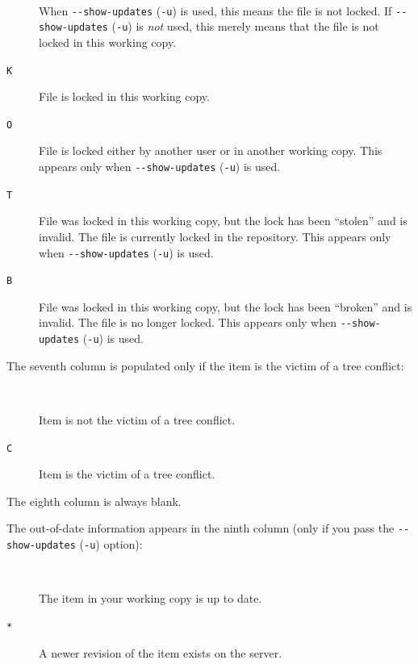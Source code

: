 \begin{description}
\item[\texttt{\textquotesingle{}\ \textquotesingle{}}]
When \texttt{-\/-show-updates} (\texttt{-u}) is used, this means the
file is not locked. If \texttt{-\/-show-updates} (\texttt{-u}) is
\emph{not} used, this merely means that the file is not locked in this
working copy.
\item[\texttt{\textquotesingle{}K\textquotesingle{}}]
File is locked in this working copy.
\item[\texttt{\textquotesingle{}O\textquotesingle{}}]
File is locked either by another user or in another working copy. This
appears only when \texttt{-\/-show-updates} (\texttt{-u}) is used.
\item[\texttt{\textquotesingle{}T\textquotesingle{}}]
File was locked in this working copy, but the lock has been ``stolen''
and is invalid. The file is currently locked in the repository. This
appears only when \texttt{-\/-show-updates} (\texttt{-u}) is used.
\item[\texttt{\textquotesingle{}B\textquotesingle{}}]
File was locked in this working copy, but the lock has been ``broken''
and is invalid. The file is no longer locked. This appears only when
\texttt{-\/-show-updates} (\texttt{-u}) is used.
\end{description}

The seventh column is populated only if the item is the victim of a tree
conflict:

\begin{description}
\item[\texttt{\textquotesingle{}\ \textquotesingle{}}]
Item is not the victim of a tree conflict.
\item[\texttt{\textquotesingle{}C\textquotesingle{}}]
Item is the victim of a tree conflict.
\end{description}

The eighth column is always blank.

The out-of-date information appears in the ninth column (only if you
pass the \texttt{-\/-show-updates} (\texttt{-u}) option):

\begin{description}
\item[\texttt{\textquotesingle{}\ \textquotesingle{}}]
The item in your working copy is up to date.
\item[\texttt{\textquotesingle{}*\textquotesingle{}}]
A newer revision of the item exists on the server.
\end{description}

